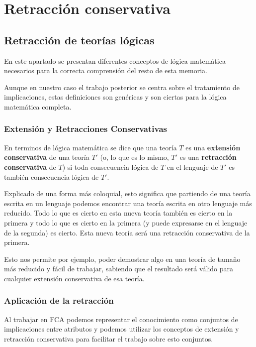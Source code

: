 \chapter*{Retracción conservativa}

	
\section*{Retracción de teorías lógicas}
	
	En este apartado se presentan diferentes conceptos de lógica matemática necesarios para la correcta comprensión del resto de esta memoria.
	
	Aunque en nuestro caso el trabajo posterior se centra sobre el tratamiento de implicaciones, estas definiciones son genéricas y 
	son ciertas para la lógica matemática completa.
	
	
\subsection*{Extensión y Retracciones Conservativas}
	
	En terminos de lógica matemática se dice que una teoría $T$ es una \textbf{extensión conservativa} de una teoría $T'$ (o, lo que es lo mismo, $T'$ es una \textbf{retracción conservativa} de $T$) si toda consecuencia lógica de $T$ en el lenguaje de $T'$ es también consecuencia lógica de $T'$.
	
	Explicado de una forma más coloquial, esto significa que partiendo de una teoría escrita en un lenguaje podemos encontrar una teoría escrita en otro lenguaje más reducido. Todo lo que es cierto en esta nueva teoría también es cierto en la primera y todo lo que es cierto en la primera (y puede expresarse en el lenguaje de la segunda) es cierto. Esta nueva teoría será una retracción conservativa de la primera.
	
	Esto nos permite por ejemplo, poder demostrar algo en una teoría de tamaño más reducido y fácil de trabajar, sabiendo que el resultado será válido para cualquier extensión conservativa de esa teoría.
	
	
\subsection*{Aplicación de la retracción}
	
	Al trabajar en FCA podemos representar el conocimiento como conjuntos de implicaciones entre atributos y podemos utilizar los conceptos de extensión y retracción conservativa para facilitar el trabajo sobre esto conjuntos.
	
